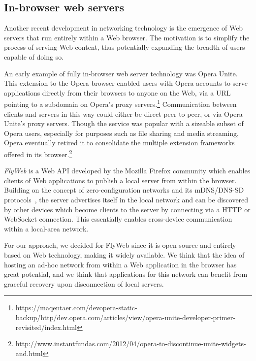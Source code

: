 \subsection{In-browser web servers}
\label{sec:in_browser_servers}

Another recent development in networking technology is the emergence of Web servers that run entirely within a Web browser. 
The motivation is to simplify the process of serving Web content, thus potentially expanding the breadth of users capable of doing so.

An early example of fully in-browser web server technology was Opera Unite.
This extension to the Opera browser enabled users with Opera accounts to serve applications directly from their browsers to anyone on the Web, via a URL pointing to a subdomain on Opera's proxy servers.\footnote{https://maqentaer.com/devopera-static-backup/http/dev.opera.com/articles/view/opera-unite-developer-primer-revisited/index.html}
Communication between clients and servers in this way could either be direct peer-to-peer, or via Opera Unite's proxy servers.
Though the service was popular with a sizeable subset of Opera users, especially for purposes such as file sharing and media streaming, Opera eventually retired it to consolidate the multiple extension frameworks offered in its browser.\footnote{http://www.instantfundas.com/2012/04/opera-to-discontinue-unite-widgets-and.html}

\textit{FlyWeb} is a Web API developed by the Mozilla Firefox community which enables clients of Web applications to publish a local server from within the browser.
Building on the concept of zero-configuration networks and its mDNS/DNS-SD protocols~\cite{rfc6762, rfc6763}, the server advertises itself in the local network and can be discovered by other devices which become clients to the server by connecting via a HTTP or WebSocket connection.
This essentially enables cross-device communication within a local-area network.

For our approach, we decided for FlyWeb since it is open source and entirely based on Web technology, making it widely available.
We think that the idea of hosting an ad-hoc network from within a Web application in the browser has great potential, and we think that applications for this network can benefit from graceful recovery upon disconnection of local servers.